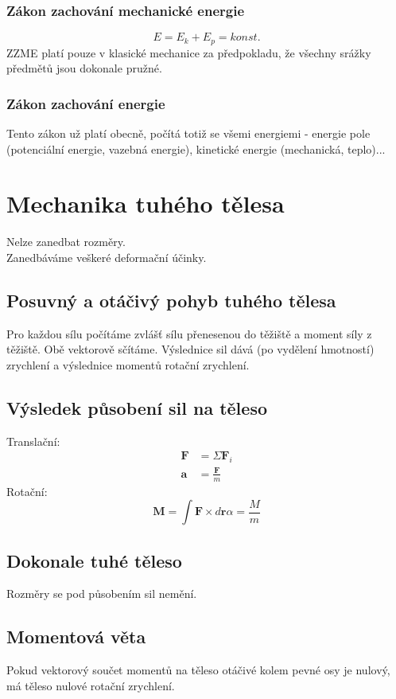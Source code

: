 \documentclass[titlepage]{report}
\begin{document}
\subsection{Zákon zachování mechanické energie}
\begin{equation}
E = E_k + E_p = konst.
\end{equation}
ZZME platí pouze v klasické mechanice za předpokladu, že všechny srážky předmětů jsou dokonale pružné.
\subsection{Zákon zachování energie}
Tento zákon už platí obecně, počítá totiž se všemi energiemi - energie pole (potenciální energie, vazebná energie), kinetické energie (mechanická, teplo)...
\chapter{Mechanika tuhého tělesa}
Nelze zanedbat rozměry.\\
Zanedbáváme veškeré deformační účinky.
\section{Posuvný a otáčivý pohyb tuhého tělesa}
Pro každou sílu počítáme zvlášť sílu přenesenou do těžiště a moment síly z těžiště. Obě vektorově sčítáme. Výslednice sil dává (po vydělení hmotností) zrychlení a výslednice momentů rotační zrychlení.
\section{Výsledek působení sil na těleso}
Translační:
\begin{align}
\boldsymbol F &= \Sigma \boldsymbol F_i\\
\boldsymbol a &= \frac{\boldsymbol F}{m}
\end{align}
Rotační:
\begin{equation}
\boldsymbol M = \int \boldsymbol F \times d\boldsymbol r
\alpha = \frac{M}{m}
\end{equation}
\section{Dokonale tuhé těleso}
Rozměry se pod působením sil nemění.
\section{Momentová věta}
Pokud vektorový součet momentů na těleso otáčivé kolem pevné osy je nulový, má těleso nulové rotační zrychlení.
\end{document}
